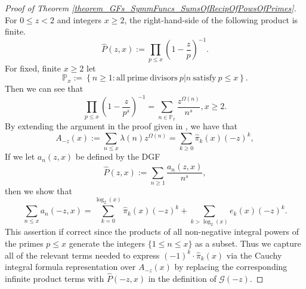 \documentclass[11pt,reqno,a4letter]{article}
\numberwithin{figure}{section}
\numberwithin{table}{section}
\theoremstyle{plain}
\numberwithin{theorem}{section}
\theoremstyle{definition}
\newcommand{\NBRef}[1]{}
\begin{document}
\NBRef{A06-2020-04-26} 
\begin{proof}[Proof of Theorem \ref{theorem_GFs_SymmFuncs_SumsOfRecipOfPowsOfPrimes}] 
\label{proofOf_theorem_GFs_SymmFuncs_SumsOfRecipOfPowsOfPrimes} 
For $0 \leq z < 2$ and integers $x \geq 2$, 
the right-hand-side of the following product is finite. 
\[
\widehat{P}(z, x) := \prod_{p \leq x} \left(1 - \frac{z}{p}\right)^{-1}. 
\]
For fixed, finite $x \geq 2$ let 
\[
\mathbb{P}_x := \left\{n \geq 1: \mathrm{ all\ prime\ divisors\ } 
     p|n \mathrm{\ satisfy\ } p \leq x\right\}. 
\]
Then we can see that 
\begin{equation} 
\label{eqn_proof_tag_PHatFiniteTruncProdFactorOfGz_v2} 
\prod_{p \leq x} \left(1 - \frac{z}{p^s}\right)^{-1} = \sum_{n \in \mathbb{P}_x} 
     \frac{z^{\Omega(n)}}{n^s}, x \geq 2. 
\end{equation} 
By extending the argument in the proof given in 
\cite[\S 7.4]{MV}, we have that 
\[
A_{-z}(x) := \sum_{n \leq x} \lambda(n) z^{\Omega(n)} = 
     \sum_{k \geq 0} \widehat{\pi}_k(x) (-z)^k, 
\] 
If we let $a_n(z, x)$ be defined by the DGF 
\[
\widehat{P}(z, x) := \sum_{n \geq 1} \frac{a_n(z, x)}{n^s}, 
\]
then we show that 
\[
\sum_{n \leq x} a_n(-z, x) = 
     \sum_{k=0}^{\log_2(x)} \widehat{\pi}_k(x) (-z)^k + 
     \sum_{k > \log_2(x)} e_k(x) (-z)^{k}. 
\]
This assertion if correct since the products of all non-negative integral powers of the 
primes $p \leq x$ generate the integers $\{1 \leq n \leq x\}$ as a subset. 
Thus we capture all of the relevant terms needed to express 
$(-1)^{k} \cdot \widehat{\pi}_k(x)$ 
via the Cauchy integral formula representation over $A_{-z}(x)$ by 
replacing the corresponding infinite product terms with 
$\widehat{P}(-z, x)$ in the definition of $\mathcal{G}(-z)$. 


\end{proof}
\end{document}
